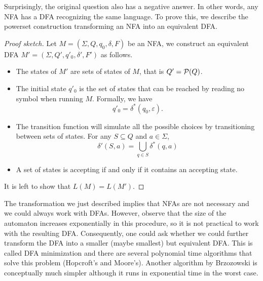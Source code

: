\documentclass[main.tex]{subfiles}
\begin{document}
Surprisingly, the original question also has a negative answer. In other words, any NFA has a DFA recognizing the same language. To prove this, we describe the powerset construction transforming an NFA into an equivalent DFA.

\begin{proof}[Proof sketch]
	Let $M = (\Sigma, Q, q_0, \delta, F)$ be an NFA, we construct an equivalent DFA $M' = (\Sigma, Q', q'_0, \delta', F')$ as follows.
	\begin{itemize}
		\item The states of $M'$ are sets of states of $M$, that is $Q' = \mathcal{P}(Q)$.
		\item The initial state $q'_0$ is the set of states that can be reached by reading no symbol when running $M$. Formally, we have 
		\[q'_0 = \delta^*(q_0, \varepsilon).\]
		\item The transition function will simulate all the possible choices by transitioning between sets of states. For any $S \subseteq Q$ and $a \in \Sigma$,
		\[\delta'(S, a) = \bigcup_{q \in S} \delta^*(q,a)\]
		\item A set of states is accepting if and only if it contains an accepting state. 
	\end{itemize}
	It is left to show that $L(M) = L(M')$.
\end{proof}

The transformation we just described implies that NFAs are not necessary and we could always work with DFAs. However, observe that the size of the automaton increases exponentially in this procedure, so it is not practical to work with the resulting DFA. Consequently, one could ask whether we could further transform the DFA into a smaller (maybe smallest) but equivalent DFA. This is called DFA minimization and there are several polynomial time algorithms that solve this problem (Hopcroft's and Moore's). Another algorithm by Brzozowski is conceptually much simpler although it runs in exponential time in the worst case.
\end{document}
